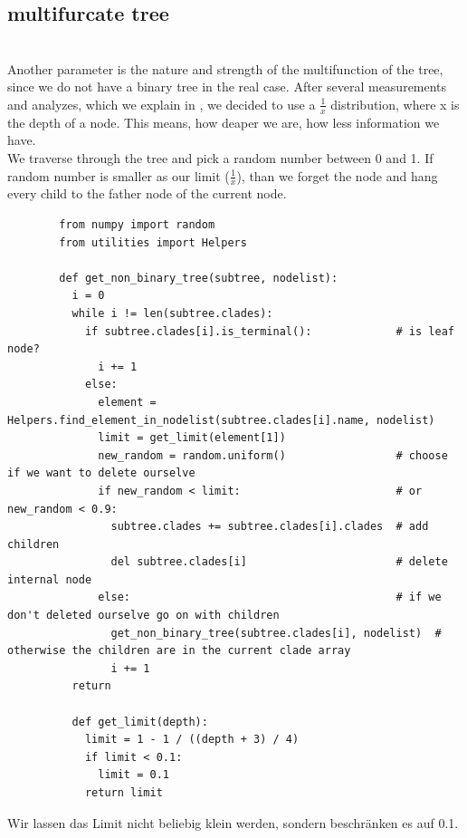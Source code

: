     \subsection{multifurcate tree}
       \\
      Another parameter is the nature and strength of the multifunction of the tree, since we do not 
        have a binary tree in the real case. After several measurements and analyzes, which we explain 
        in ,  we decided to use a $\frac{1}{x}$ distribution, where x is the depth 
        of a node. This means, how deaper we are, how less information we have. \\
      We traverse through the tree and pick a random number between 0 and 1. If random number is smaller 
        as our limit ($\frac{1}{x}$), than we forget the node and hang every child to the father node of 
        the current node. \\
      \begin{lstlisting}
        from numpy import random
        from utilities import Helpers

        def get_non_binary_tree(subtree, nodelist):
          i = 0
          while i != len(subtree.clades):
            if subtree.clades[i].is_terminal():             # is leaf node?
              i += 1
            else:
              element = Helpers.find_element_in_nodelist(subtree.clades[i].name, nodelist)
              limit = get_limit(element[1])
              new_random = random.uniform()                 # choose if we want to delete ourselve
              if new_random < limit:                        # or new_random < 0.9:
                subtree.clades += subtree.clades[i].clades  # add children
                del subtree.clades[i]                       # delete internal node
              else:                                         # if we don't deleted ourselve go on with children
                get_non_binary_tree(subtree.clades[i], nodelist)  # otherwise the children are in the current clade array
                i += 1
          return

          def get_limit(depth):
            limit = 1 - 1 / ((depth + 3) / 4)
            if limit < 0.1:
              limit = 0.1
            return limit
      \end{lstlisting}
      Wir lassen das Limit nicht beliebig klein werden, sondern beschränken es auf 0.1.

